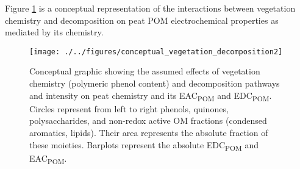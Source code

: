 \documentclass[draft,linenumbers]{agujournal2018}
\begin{document}
\clearpage

Figure \ref{fig:conceptual2} is a conceptual representation of the
interactions between vegetation chemistry and decomposition on peat POM
electrochemical properties as mediated by its chemistry.

\begin{figure}[H]

{\centering \texttt{[image: ./../figures/conceptual\_vegetation\_decomposition2]} 

}

\caption{Conceptual graphic showing the assumed effects of vegetation chemistry (polymeric phenol content) and decomposition pathways and intensity on peat chemistry and its EAC\textsubscript{POM} and EDC\textsubscript{POM}. Circles represent from left to right phenols, quinones, polysaccharides, and non-redox active OM fractions (condensed aromatics, lipids). Their area represents the absolute fraction of these moieties. Barplots represent the absolute EDC\textsubscript{POM} and EAC\textsubscript{POM}.}\label{fig:conceptual2}
\end{figure}


\end{document}
